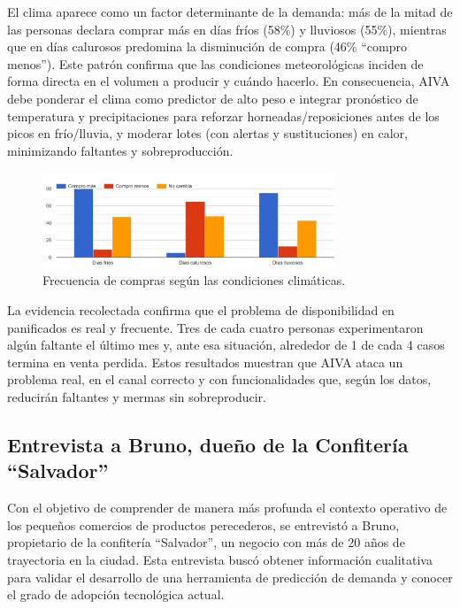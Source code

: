 El clima aparece como un factor determinante de la demanda: más de la mitad de las personas declara comprar más en días fríos (58\%) y lluviosos (55\%), mientras que en días calurosos predomina la disminución de compra (46\% “compro menos”). Este patrón confirma que las condiciones meteorológicas inciden de forma directa en el volumen a producir y cuándo hacerlo. En consecuencia, AIVA debe ponderar el clima como predictor de alto peso e integrar pronóstico de temperatura y precipitaciones para reforzar horneadas/reposiciones antes de los picos en frío/lluvia, y moderar lotes (con alertas y sustituciones) en calor, minimizando faltantes y sobreproducción.

\begin{figure}[t]
    \centering
    \includegraphics[width=0.78\textwidth]{images/CompraSegunClima.png}
    \caption{Frecuencia de compras según las condiciones climáticas.}
    \label{fig:compras-segun-clima}
\end{figure}


La evidencia recolectada confirma que el problema de disponibilidad en panificados es real y frecuente. Tres de cada cuatro personas experimentaron algún faltante el último mes y, ante esa situación, alrededor de 1 de cada 4 casos termina en venta perdida. Estos resultados muestran que AIVA ataca un problema real, en el canal correcto y con funcionalidades que, según los datos, reducirán faltantes y mermas sin sobreproducir.


\subsection{Entrevista a Bruno, dueño de la Confitería ``Salvador''}

Con el objetivo de comprender de manera más profunda el contexto operativo de los pequeños comercios de productos perecederos, se entrevistó a Bruno, propietario de la confitería ``Salvador'', un negocio con más de 20 años de trayectoria en la ciudad. Esta entrevista buscó obtener información cualitativa para validar el desarrollo de una herramienta de predicción de demanda y conocer el grado de adopción tecnológica actual.

